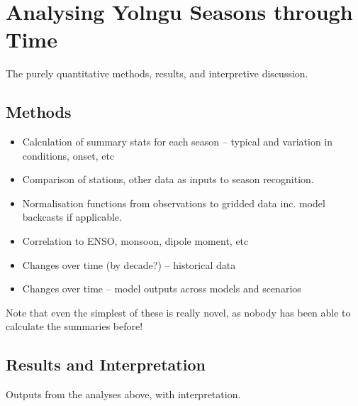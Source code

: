 \chapter{Analysing Yolngu Seasons through Time}
The purely quantitative methods, results, and interpretive discussion.

\section{Methods}

\begin{itemize}
\item Calculation of summary stats for each season – typical and variation in conditions, onset, etc
\item Comparison of stations, other data as inputs to season recognition.
\item Normalisation functions from observations to gridded data inc. model backcasts if applicable.
\item Correlation to ENSO, monsoon, dipole moment, etc
\item Changes over time (by decade?) – historical data
\item Changes over time – model outputs across models and scenarios
\end{itemize}

Note that even the simplest of these is really novel, as nobody has been able to calculate the summaries before!

\section{Results and Interpretation}
Outputs from the analyses above, with interpretation.

